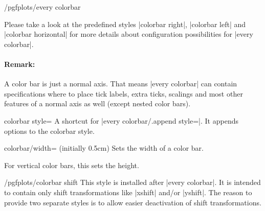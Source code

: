\begin{stylekey}{/pgfplots/every colorbar}
\begin{codeexample}[]
\end{codeexample}
	Please take a look at the predefined styles |colorbar right|, |colorbar left| and |colorbar horizontal| for more details about configuration possibilities for |every colorbar|.

	\paragraph{Remark:} A color bar is just a normal axis. That means |every colorbar| can contain specifications where to place tick labels, extra ticks, scalings and most other features of a normal axis as well (except nested color bars).
\end{stylekey}

\begin{pgfplotskey}{colorbar style=}
	A shortcut for |every colorbar/.append style=|. It appends options to the colorbar style.
\end{pgfplotskey}

\begin{pgfplotskey}{colorbar/width= (initially 0.5cm)}
	Sets the width of a color bar.
\pgfplotsexpensiveexample
\begin{codeexample}[]
\end{codeexample}

	For vertical color bars, this sets the height.
\end{pgfplotskey}


\begin{stylekey}{/pgfplots/colorbar shift}
	This style is installed after |every colorbar|. It is intended to contain only shift transformations like |xshift| and/or |yshift|. The reason to provide two separate styles is to allow easier deactivation of shift transformations.

\begin{codeexample}
\end{codeexample}
\end{stylekey}

